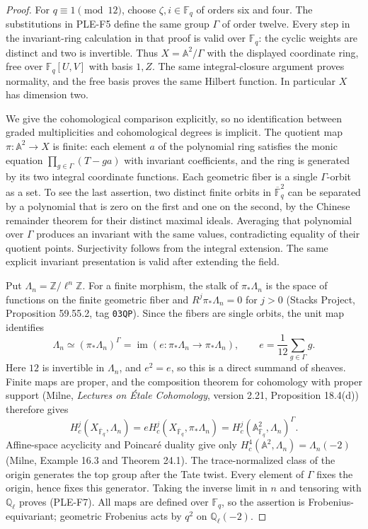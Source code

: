 \documentclass[11pt,a4paper]{article}
\begin{document}
\begin{proof}
For $q\equiv1\pmod{12}$, choose $\zeta,i\in\mathbb F_q$ of orders
six and four. The substitutions in PLE-F5 define the same group $\Gamma$
of order twelve. Every step in the invariant-ring calculation in that
proof is valid over $\mathbb F_q$: the cyclic weights are distinct and
two is invertible. Thus $X=\mathbb A^2/\Gamma$ with the displayed
coordinate ring, free over $\mathbb F_q[U,V]$ with basis $1,Z$.
The same integral-closure argument proves normality, and the free basis
proves the same Hilbert function. In particular $X$ has dimension two.

We give the cohomological comparison explicitly, so no identification
between graded multiplicities and cohomological degrees is implicit.
The quotient map $\pi:\mathbb A^2\to X$ is finite: each element $a$ of
the polynomial ring satisfies the monic equation
$\prod_{g\in\Gamma}(T-ga)$ with invariant coefficients, and the ring
is generated by its two integral coordinate functions.
Each geometric fiber is a single $\Gamma$-orbit as a set. To see the
last assertion, two distinct finite orbits in $\overline{\mathbb F}_q^2$
can be separated by a polynomial that is zero on the first and one on
the second, by the Chinese remainder theorem for their distinct maximal
ideals. Averaging that polynomial over $\Gamma$ produces an invariant
with the same values, contradicting equality of their quotient points.
Surjectivity follows from the integral extension. The same explicit
invariant presentation is valid after extending the field.

Put $\Lambda_n=\mathbb Z/\ell^n\mathbb Z$. For a finite morphism,
the stalk of $\pi_*\Lambda_n$ is the space of functions on the finite
geometric fiber and $R^j\pi_*\Lambda_n=0$ for $j>0$
(Stacks Project, Proposition 59.55.2, tag \texttt{03QP}). Since the fibers
are single orbits, the unit map identifies
\[
 \Lambda_n\simeq(\pi_*\Lambda_n)^\Gamma
 =\operatorname{im}\left(e:\pi_*\Lambda_n\to\pi_*\Lambda_n\right),
 \qquad e=\frac1{12}\sum_{g\in\Gamma}g.
\]
Here $12$ is invertible in $\Lambda_n$, and $e^2=e$, so this is a direct
summand of sheaves. Finite maps are proper, and the composition theorem
for cohomology with proper support (Milne, \emph{Lectures on \'Etale
Cohomology}, version 2.21, Proposition 18.4(d)) therefore gives
\[
 H_c^j(X_{\overline{\mathbb F}_q},\Lambda_n)
 =eH_c^j(X_{\overline{\mathbb F}_q},\pi_*\Lambda_n)
 =H_c^j(\mathbb A^2_{\overline{\mathbb F}_q},\Lambda_n)^\Gamma.
\]
Affine-space acyclicity and Poincar\'e duality give only
$H_c^4(\mathbb A^2,\Lambda_n)=\Lambda_n(-2)$
(Milne, Example 16.3 and Theorem 24.1).
The trace-normalized class of the origin generates the top group after
the Tate twist. Every element of $\Gamma$ fixes the origin, hence fixes
this generator. Taking the inverse limit in $n$ and tensoring with
$\mathbb Q_\ell$ proves (PLE-F7). All maps are defined over
$\mathbb F_q$, so the assertion is Frobenius-equivariant; geometric
Frobenius acts by $q^2$ on $\mathbb Q_\ell(-2)$.


\end{proof}
\end{document}
